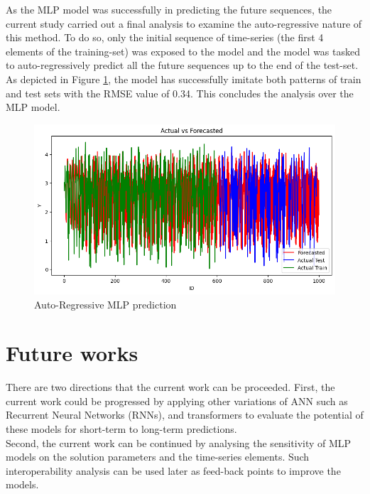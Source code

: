\documentclass{article}
\begin{document}
\newpage
As the MLP model was successfully in predicting the future sequences, the current study carried out a final analysis to examine the auto-regressive nature of this method. To do so, only the initial sequence of time-series (the first 4 elements of the training-set) was exposed to the model and the model was tasked to auto-regressively predict all the future sequences up to the end of the test-set. As depicted in Figure \ref{fig:ANN-AR}, the model has successfully imitate both patterns of train and test sets with the RMSE value of 0.34. This concludes the analysis over the MLP model.
\begin{figure}[h!]
    \centering
    \includegraphics[width=0.675\linewidth]{Fig06.png}
    \caption{\label{fig:ANN-AR} Auto-Regressive MLP prediction}
\end{figure}

\newpage
\section{Future works}
There are two directions that the current work can be proceeded. First, the current work could be progressed by applying other variations of ANN such as Recurrent Neural Networks (RNNs), and transformers to evaluate the potential of these models for short-term to long-term predictions.\\
Second, the current work can be continued by analysing the sensitivity of MLP models on the solution parameters and the time-series elements. Such interoperability analysis can be used later as feed-back points to improve the models.
\end{document}
